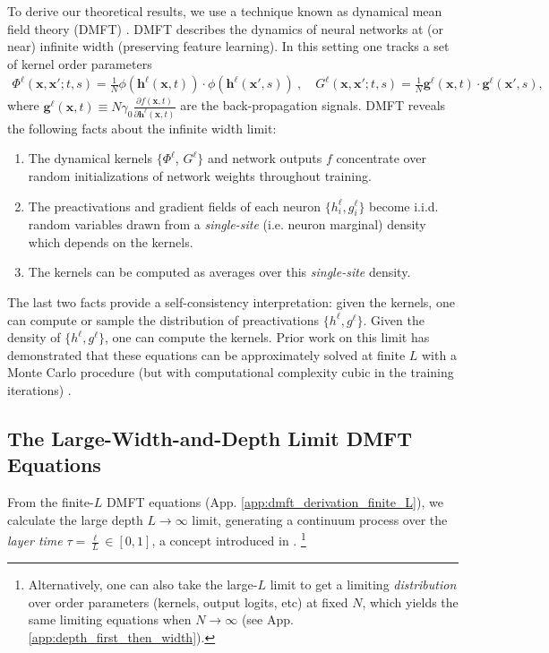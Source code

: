 \documentclass{article} %
\def\h{\bm h}
\def\x{\bm x}
\def\g{\bm g}
\newcommand{\cp}[1]{\fTBD{{\textcolor{blue}[CP: #1]}}}
\begin{document}
To derive our theoretical results, we use a technique known as dynamical mean field theory (DMFT) \cite{bordelon2022self}. DMFT describes the dynamics of neural networks at (or near) infinite width (preserving feature learning). In this setting one tracks a set of kernel order parameters 
\begin{align}
    \Phi^{\ell}(\x,\x';t,s) = \frac{1}{N} \phi(\h^\ell(\x,t)) \cdot \phi(\h^\ell(\x',s)) \ , \quad G^{\ell}(\x,\x';t,s) = \frac{1}{N} \g^\ell(\x,t) \cdot \g^\ell(\x',s) ,
\end{align}
where $\g^\ell(\x,t) \equiv N \gamma_0 \frac{\partial f(\x,t)}{\partial \h^\ell(\x,t)}$ are the back-propagation signals. DMFT reveals the following facts about the infinite width limit:
\begin{enumerate}
    \item The dynamical kernels $\{\Phi^\ell$, $G^\ell\}$ and network outputs $f$ concentrate over random initializations of network weights throughout training. 
    \item The preactivations and gradient fields of each neuron $\{ h_i^\ell, g_i^\ell \}$ become i.i.d. random variables drawn from a \textit{single-site} (i.e. neuron marginal) density which depends on the kernels.
    \item The kernels can be computed as averages over this \textit{single-site} density.
\end{enumerate}
The last two facts provide a self-consistency interpretation: given the kernels, one can compute or sample the distribution of preactivations $\{h^\ell, g^\ell\}$. Given the density of $\{ h^\ell , g^\ell \}$, one can compute the kernels. Prior work on this limit has demonstrated that these equations can be approximately solved at finite $L$ with a Monte Carlo procedure (but with computational complexity cubic in the training iterations) \citep{bordelon2022self}. 


\subsection{The Large-Width-and-Depth Limit DMFT Equations}\label{sec:large_width_depth_limit_equations}

From the finite-$L$ DMFT equations (App. \ref{app:dmft_derivation_finite_L}), we calculate the large depth $L \to \infty$ limit, generating a continuum process over the \textit{layer time} $\tau = \frac{\ell}{L} \in [0,1]$, a concept introduced in \citet{li2022neural}. 
% 
\footnote{Alternatively, one can also take the large-$L$ limit to get a limiting \textit{distribution} over order parameters (kernels, output logits, etc) at fixed $N$, which yields the same limiting equations when $N \to \infty$ (see  App. \ref{app:depth_first_then_width}).} 
\end{document}
